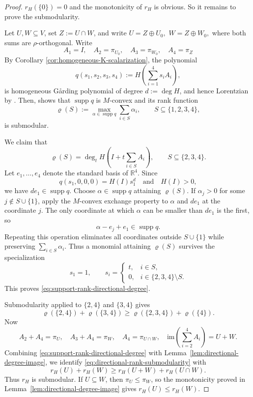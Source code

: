 \documentclass[oneside,english,letterpaper]{amsart}
\numberwithin{equation}{section}
\theoremstyle{plain}
\theoremstyle{definition}
\theoremstyle{remark}
\newcommand{\gar}{\ifmmode\mathrm{G\mathring{a}rding}\else G{\aa}rding\fi}
\begin{document}
\begin{proof}
$r_H(\{0\})=0$ and the monotonicity of $r_H$ is obvious. So it remains to prove the submodularity.

Let $U,W\subseteq V$, set $Z:=U\cap W$, and write
$
U=Z\oplus U_0,$ $ W=Z\oplus W_0,$
where both sums are $\rho$-orthogonal. Write $$A_1=I,\quad A_2=\pi_{U_0},\quad A_3=\pi_{W_0},\quad A_4=\pi_{Z}$$
By Corollary \ref{cor:homogeneous-K-scalarization}, the polynomial
\[
q(s_1,s_2,s_3,s_4):=H(\sum_{i=1}^4 s_i A_i),
\]
is homogeneous \gar{} polynomial of degree $d:=\deg H$, and hence Lorentzian by \cite[Theorem 11.2]{Fang-MaGard}. Then, \cite[Theorem 2.23]{BrandenHuh20} shows that
$\operatorname{supp}q$ is $M$-convex and its rank function
\[
\varrho(S):=\max_{\alpha\in\operatorname{supp}q}\sum_{i\in S}\alpha_i,
\qquad S\subseteq\{1,2,3,4\},
\]
is submodular.

We claim that
\begin{equation}
\varrho(S)
=
\deg_t H\left(I+t\sum_{i\in S}A_i\right),
\qquad S\subseteq\{2,3,4\}.
\label{eq:support-rank-directional-degree}
\end{equation}
Let $e_1,\ldots,e_4$ denote the standard basis of $\mathbb R^4$.
Since
\[
q(s_1,0,0,0)=H(I)s_1^d
\quad\text{and}\quad H(I)>0,
\]
we have $d e_1\in\operatorname{supp}q$.
Choose $\alpha\in\operatorname{supp}q$ attaining $\varrho(S)$.
If $\alpha_j>0$ for some $j\notin S\cup\{1\}$, apply the
$M$-convex exchange property to $\alpha$ and $d e_1$ at
the coordinate $j$. The only coordinate at which $\alpha$
can be smaller than $d e_1$ is the first, so
\[
\alpha-e_j+e_1\in\operatorname{supp}q.
\]
Repeating this operation eliminates all coordinates outside
$S\cup\{1\}$ while preserving $\sum_{i\in S}\alpha_i$.
Thus a monomial attaining $\varrho(S)$ survives the
specialization
\[
s_1=1,\qquad
s_i=
\begin{cases}
t,&i\in S,\\
0,&i\in\{2,3,4\}\setminus S.
\end{cases}
\]
This proves \eqref{eq:support-rank-directional-degree}.

Submodularity applied to $\{2,4\}$ and $\{3,4\}$ gives
\begin{equation}
\varrho(\{2,4\})+\varrho(\{3,4\})
\geq
\varrho(\{2,3,4\})+\varrho(\{4\}).
\label{eq:directional-rank-submodularity}
\end{equation}
Now
\[
A_2+A_4=\pi_U,\quad
A_3+A_4=\pi_W,\quad
A_4=\pi_{U\cap W}, \quad \mathrm{im} \left(\sum_{i=2}^4 A_i\right)=U+W.
\]
Combining \eqref{eq:support-rank-directional-degree} with
Lemma~\ref{lem:directional-degree-image}, we identify
\eqref{eq:directional-rank-submodularity} with
\[
r_H(U)+r_H(W)
\geq
r_H(U+W)+r_H(U\cap W).
\]
Thus $r_H$ is submodular. If \(U\subseteq W\), then \(\pi_U\leq\pi_W\), so the monotonicity
proved in Lemma~\ref{lem:directional-degree-image} gives
\(r_H(U)\leq r_H(W)\).
\end{proof}
\end{document}
